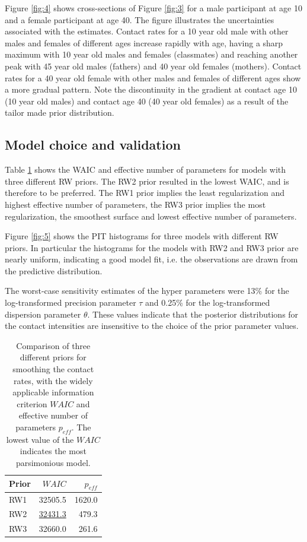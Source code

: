 \documentclass[aoas,preprint]{imsart}
\numberwithin{equation}{section}
\begin{document}
Figure \ref{fig:4} shows cross-sections of Figure \ref{fig:3} for a male participant at age 10 and a female participant at age 40. The figure illustrates the uncertainties associated with the estimates. Contact rates for a 10 year old male with other males and females of different ages increase rapidly with age, having a sharp maximum with 10 year old males and females (classmates) and reaching another peak with 45 year old males (fathers) and 40 year old females (mothers). Contact rates for a 40 year old female with other males and females of different ages show a more gradual pattern. Note the discontinuity in the gradient at contact age 10 (10 year old males) and contact age 40 (40 year old females) as a result of the tailor made prior distribution.

\subsection{Model choice and validation}

Table \ref{tab:1} shows the WAIC and effective number of parameters for models with three different RW priors. The RW2 prior resulted in the lowest WAIC, and is therefore to be preferred. The RW1 prior implies the least regularization and highest effective number of parameters, the RW3 prior implies the most regularization, the smoothest surface and lowest effective number of parameters.

Figure \ref{fig:5} shows the PIT histograms for three models with different RW priors. In particular the histograms for the models with RW2 and RW3 prior are nearly uniform, indicating a good model fit, i.e. the observations are drawn from the predictive distribution.

The worst-case sensitivity estimates of the hyper parameters were 13\% for the log-transformed precision parameter $\tau$ and 0.25\% for the log-transformed dispersion parameter $\theta$. These values indicate that the posterior distributions for the contact intensities are insensitive to the choice of the prior parameter values.

\begin{table}
\caption{Comparison of three different priors for smoothing the contact rates, with the widely applicable information criterion $WAIC$ and effective number of parameters $p_{eff}$. The lowest value of the $WAIC$ indicates the most parsimonious model.}
\begin{tabular}{l r r}
\hline
Prior & $WAIC$ & $p_{eff}$ \\
\hline
RW1 & 32505.5 & 1620.0 \\
RW2 & \underline{32431.3} & 479.3 \\
RW3 & 32660.0 & 261.6 \\
\hline
\end{tabular}
\label{tab:1}
\end{table}
\end{document}
